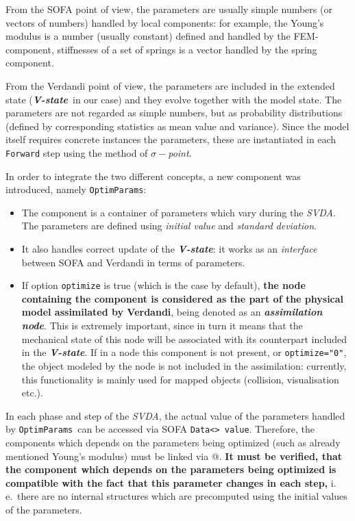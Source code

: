 \documentclass[10pt]{article}
\def\ie{i.\,e.}
\def\asn{\textit{\textbf{assimilation node}}}
\def\vstate{\textit{\textbf{V-state}}}
\def\svda{\textit{SVDA}}
\def\smp{$\sigma-$\textit{point}}
\def\opr{\texttt{OptimParams}}
\begin{document}
From the SOFA point of view, the parameters are usually simple numbers (or vectors of numbers) handled by local components: for example, the Young's
modulus is a number (usually constant) defined and handled by the FEM-component, stiffnesses of a set of springs is a vector handled by the spring
component. 

From the Verdandi point of view, the parameters are included in the extended  state (\vstate\ in our case) and they evolve together with the model
state. The parameters are not regarded as simple numbers, 
but as probability distributions (defined by corresponding statistics as mean value and variance). Since the model itself requires concrete instances
the parameters, these are instantiated in each \texttt{Forward} step using the method of \smp.

In order to integrate the two different concepts, a new component was introduced, namely \opr:
\begin{itemize}
\item The component is a container of parameters which vary during the \svda. The parameters are defined using \emph{initial value} and \emph{standard
deviation}.
\item It also handles correct update of the \vstate: it works as an \emph{interface} between SOFA and Verdandi in terms of parameters. 
\item If option \texttt{optimize} is true (which is the case by default), \textbf{the node containing the component is considered as the part of the
physical model assimilated by Verdandi}, being denoted as an \asn. This is extremely important, since in turn it means that the mechanical state of
this node will be associated with its counterpart included in the \vstate. If in a node this component is not present, or \texttt{optimize="0"}, 
the object modeled by the node is not included in the assimilation: currently, this functionality is mainly used for mapped objects
(collision, visualisation etc.). 
\end{itemize}
In each phase and step of the \svda, the actual value of the parameters handled by \opr\ can be accessed via SOFA \texttt{Data<> value}. Therefore,
the components which depends on the parameters being optimized (such as already mentioned Young's modulus) must be linked via @. \textbf{It must be
verified, that the component which depends on the parameters being optimized is compatible with the fact that this parameter changes in each step,}
\ie\ there are no internal structures which are precomputed using the initial values of the parameters. 
\end{document}
